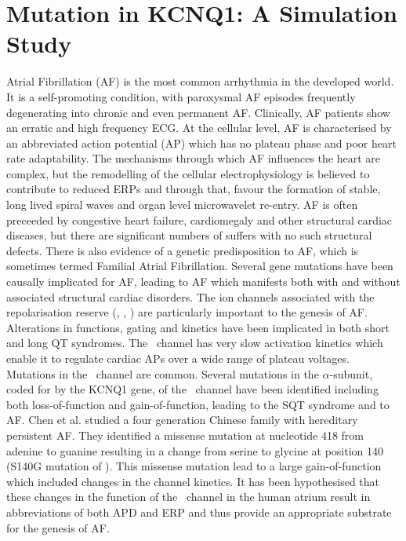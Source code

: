 \section{Mutation in KCNQ1: A Simulation Study}

Atrial Fibrillation (AF) is the most common arrhythmia in the developed world.
It is a self-promoting condition, with paroxysmal AF episodes frequently
degenerating into chronic and even permanent AF.
Clinically, AF patients show an erratic and high frequency ECG.
At the cellular level, AF is characterised by an abbreviated action potential
(AP) which has no plateau phase and poor heart rate adaptability.
The mechanisms through which AF influences the heart are complex, but the
remodelling of the cellular electrophysiology is believed to contribute to
reduced ERPs and through that, favour the formation of stable, long lived
spiral waves and organ level microwavelet re-entry.
AF is often preceeded by congestive heart failure, cardiomegaly and other
structural cardiac diseases, but there are significant numbers of suffers with
no such structural defects.
There is also evidence of a genetic predisposition to AF, which is sometimes
termed Familial Atrial Fibrillation.
Several gene mutations have been causally implicated for AF, leading to AF
which manifests both with and without associated structural cardiac disorders.
The ion channels associated with the repolarisation reserve (, ,
) are particularly important to the genesis of AF.
Alterations in functions, gating and kinetics have been implicated in both short
and long QT syndromes.
The \ channel has very slow activation kinetics which enable it to
regulate cardiac APs over a wide range of plateau voltages.
Mutations in the \ channel are common.
Several mutations in the $\alpha$-subunit, coded for by the KCNQ1 gene, of the
\ channel have been identified including both loss-of-function and
gain-of-function, leading to the SQT syndrome and to AF.
Chen et al. studied a four generation Chinese family with hereditary persistent
AF.
They identified a missense mutation at nucleotide 418 from adenine to guanine
resulting in a change from serine to glycine at position 140 (S140G mutation of
).
This missense mutation lead to a large gain-of-function which included changes
in the channel kinetics.
It has been hypothesised that these changes in the function of the \
channel in the human atrium result in abbreviations of both APD and ERP and thus
provide an appropriate substrate for the genesis of AF.

